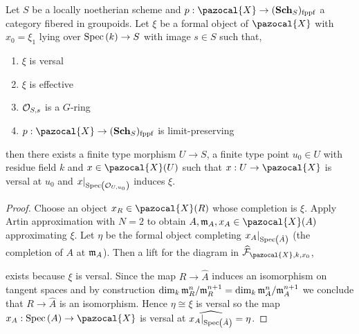 \documentclass[12pt]{article}
\renewcommand{\X}{\pazocal{X}}
\renewcommand{\F}{\mathcal{F}}
\begin{document}
\begin{lemma}
Let $S$ be a locally noetherian scheme and $p : \X \to (\Sch_S)_{\fppf}$ a category fibered in groupoids. Let $\xi$ be a formal object of $\X$ with $x_0 = \xi_1$ lying over $\mathrm{Spec}\left( k \right) \to S$ with image $s \in S$ such that,
\begin{enumerate}
\item $\xi$ is versal
\item $\xi$ is effective
\item $\mathcal{O}_{S, s}$ is a $G$-ring 
\item $p : \X \to (\Sch_S)_{\fppf}$ is limit-preserving
\end{enumerate}
then there exists a finite type morphism $U \to S$, a finite type point $u_0 \in U$ with residue field $k$ and $x \in \X(U)$ such that $x : U \to \X$ is versal at $u_0$ and $x|_{\mathrm{Spec}\left( \mathcal{O}_{U, u_0} \right)}$ induces $\xi$. 
\end{lemma}

\begin{proof}
Choose an object $x_R \in \X(R)$ whose completion is $\xi$. Apply Artin approximation with $N = 2$ to obtain $A, \m_A, x_A \in \X(A)$ approximating $\xi$. Let $\eta$ be the formal object completing $x_A |_{\mathrm{Spec}\left( \hat{A} \right)}$ (the completion of $A$ at $\mathfrak{m}_A$). Then a lift for the diagram in $\wh{\F}_{\X, k, x_0}$,
\begin{center}
\quad {} \quad
{}
\end{center}
exists because $\xi$ is versal. Since the map $R \to \hat{A}$ induces an isomorphism on tangent spaces and by construction $\dim_k \mathfrak{m}_R^n / \mathfrak{m}_R^{n+1} = \dim_k \mathfrak{m}_A^n / \mathfrak{m}_A^{n+1}$ we conclude that $R \to \hat{A}$ is an isomorphism. Hence $\eta \cong \xi$ is versal so the map $x_A : \Spec{A} \to \X$ is versal at $\widehat{x_A|_{\mathrm{Spec}\left( \hat{A} \right)}}  = \eta$. 
\end{proof}
\end{document}

